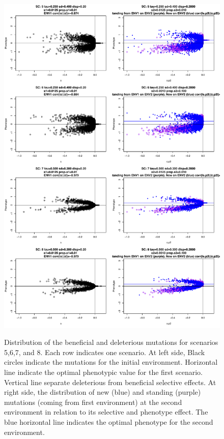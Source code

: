 \documentclass[a4paper,11pt]{article}
\begin{document}
\begin{figure}[h]
{\includegraphics[scale=0.45]{./Dist_ALLScenariosv2_2.pdf}}
\caption{Distribution of the beneficial and deleterious mutations for scenarios 5,6,7, and 8. Each row indicates one scenario. At left side, Black circles indicate the mutations for the initial environment. Horizontal line indicate the optimal phenotypic value for the first scenario. Vertical line separate deleterious from beneficial selective effects. At right side, the distribution of new (blue) and standing (purple) mutations (coming from first environment) at the second environment in relation to its selective and phenotype effect. The blue horizontal line indicates the optimal phenotype for the second environment.}
\label{DistALLScenariosv22}
\hspace*{-0.5cm}
\end{figure}
\end{document}
